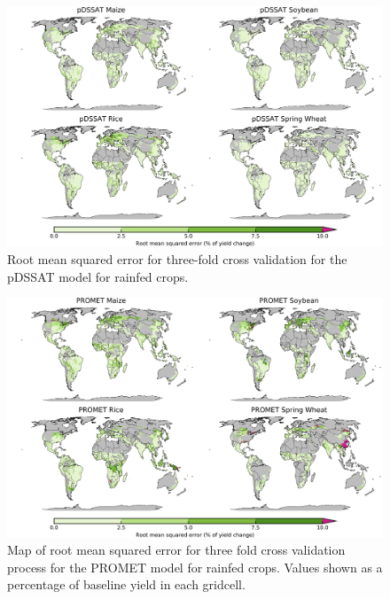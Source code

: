 \documentclass[10pt]{article}
\begin{document}
\begin{figure}[h!]
\centering
\includegraphics[width=15.5cm]{pDSSAT_spatial_MSE_ton_ha.png}
\caption{Root mean squared error for three-fold cross validation for the pDSSAT model for rainfed crops.}
\label{fig:pdssatrmse}
\end{figure}

\begin{figure}[h!]
\centering
\includegraphics[width=15.5cm]{PROMET_spatial_MSE_ton_ha.png}
\caption{Map of root mean squared error for three fold cross validation process for the PROMET model for rainfed crops. Values shown as a percentage of baseline yield in each gridcell.}
\label{fig:pdssatrmse}
\end{figure}
\end{document}

